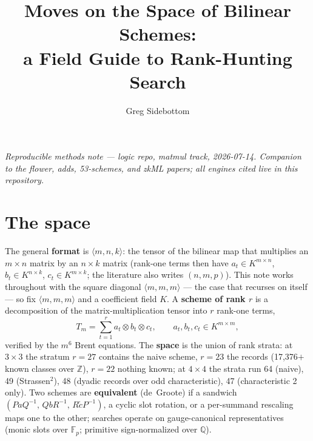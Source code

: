 \documentclass[10pt]{article}
\title{\bfseries Moves on the Space of Bilinear Schemes:\\
a Field Guide to Rank-Hunting Search}
\author{Greg Sidebottom}
\date{}
\begin{document}
\maketitle
\vspace{-2.5em}
\begin{center}\itshape
Reproducible methods note --- logic repo, matmul track, 2026-07-14.
Companion to the flower, adds, 53-schemes, and zkML papers; all
engines cited live in this repository.
\end{center}

\section{The space}

The general \textbf{format} is $\langle m,n,k\rangle$: the tensor
of the bilinear map that multiplies an $m{\times}n$ matrix by an
$n{\times}k$ matrix (rank-one terms then have
$a_t \in K^{m\times n}$, $b_t \in K^{n\times k}$,
$c_t \in K^{m\times k}$; the literature also writes $(n,m,p)$).
This note works throughout with the square diagonal
$\langle m,m,m\rangle$ --- the case that recurses on itself ---
so fix $\langle m,m,m\rangle$ and a coefficient field $K$. A
\textbf{scheme of rank $r$} is a decomposition of the
matrix-multiplication tensor into $r$ rank-one terms,
\[
T_m = \sum_{t=1}^{r} a_t \otimes b_t \otimes c_t,
\qquad a_t, b_t, c_t \in K^{m\times m},
\]
verified by the $m^6$ Brent equations. The \textbf{space} is the
union of rank strata: at $3{\times}3$ the stratum $r=27$ contains
the naive scheme, $r=23$ the records (17{,}376$+$ known classes
over $\mathbb{Z}$), $r=22$ nothing known; at $4{\times}4$ the
strata run 64 (naive), 49 (Strassen$^2$), 48 (dyadic records over
odd characteristic), 47 (characteristic 2 only). Two schemes are
\textbf{equivalent} (de~Groote) if a sandwich
$(P a Q^{-1},\, Q b R^{-1},\, R \tilde c P^{-1})$, a cyclic slot
rotation, or a per-summand rescaling maps one to the other;
searches operate on gauge-canonical representatives (monic slots
over $\mathbb{F}_p$; primitive sign-normalized over $\mathbb{Q}$).
\end{document}
